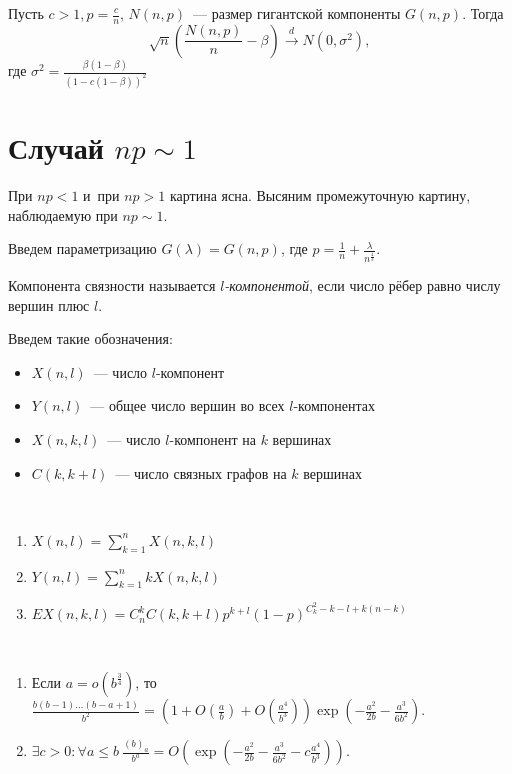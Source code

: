 \documentclass{article}
\begin{document}
\begin{theorem}
	Пусть $c > 1, p = \frac{c}{n}$, $N(n, p)$~--- размер гигантской компоненты $G(n, p)$. Тогда
	$$ \sqrt{n} \left( \frac{N(n, p)}{n} - \beta \right) \overset{d}\rightarrow N(0, \sigma^2),$$
	где $\sigma^2 = \frac{\beta(1 - \beta)}{(1 - c(1 - \beta))^2}$
\end{theorem}

\section{Случай $np \sim 1$}

При $np < 1$ и~при $np > 1$ картина ясна. Высяним промежуточную картину, наблюдаемую при $np \sim
1$.

Введем параметризацию $G(\lambda) = G(n, p)$, где $p = \frac{1}{n} + \frac{\lambda}{n^\frac{4}{3}}$.

\begin{definition}
	Компонента связности называется \emph{$l$-компонентой}, если число рёбер равно числу вершин плюс
	$l$.
\end{definition}

Введем такие обозначения:
\begin{itemize}
	\item $X(n, l)$~--- число $l$-компонент
	\item $Y(n, l)$~--- общее число вершин во всех $l$-компонентах
	\item $X(n, k, l)$~--- число $l$-компонент на $k$ вершинах
	\item $C(k, k + l)$~--- число связных графов на $k$ вершинах
\end{itemize}

\begin{claim}~
	\begin{enumerate}
		\item $X(n, l) = \sum\limits_{k=1}^n X(n, k, l)$
		\item $Y(n, l) = \sum\limits_{k=1}^n kX(n, k, l)$
		\item $EX(n, k, l) = C_n^k C(k, k + l) p^{k+l} (1-p)^{C_k^2 - k - l + k(n - k)}$
	\end{enumerate}
\end{claim}

\begin{claim}~
	\begin{enumerate}
		\item Если $a = o(b^\frac{3}{4})$, то $\frac{b(b-1)\ldots(b-a+1)}{b^2} = (1 + O(\frac{a}{b}) +
			O(\frac{a^4}{b^3})) \exp\left(-\frac{a^2}{2b} - \frac{a^3}{6b^2}\right)$.
		\item $\exists c > 0: \forall a \le b\ \frac{(b)_a}{b^a} = O(\exp\left(-\frac{a^2}{2b} -
			\frac{a^3}{6b^2} - c\frac{a^4}{b^3}\right))$.
	\end{enumerate}
\end{claim}
\end{document}
